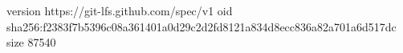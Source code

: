 version https://git-lfs.github.com/spec/v1
oid sha256:f2383f7b5396c08a361401a0d29c2d2fd8121a834d8ecc836a82a701a6d517dc
size 87540
